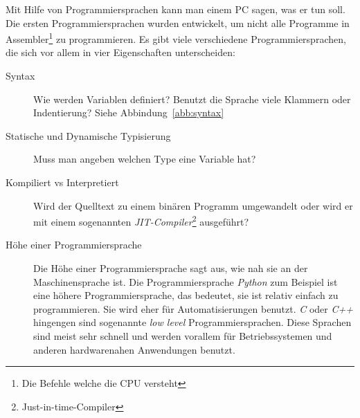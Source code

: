 \documentclass[a4paper, ngerman, 11pt]{scrartcl}
\begin{document}
Mit Hilfe von Programmiersprachen kann man einem PC sagen, was er tun soll.
Die ersten Programmiersprachen wurden entwickelt, um nicht alle Programme in Assembler\footnote{Die Befehle welche die CPU versteht} zu programmieren.
Es gibt viele verschiedene Programmiersprachen, die sich vor allem in vier Eigenschaften unterscheiden:

\begin{description}
	\item[Syntax]
		Wie werden Variablen definiert?
		Benutzt die Sprache viele Klammern oder Indentierung? Siehe Abbindung~\ref{abb:syntax}
	\item[Statische und Dynamische Typisierung]
		Muss man angeben welchen Type eine Variable hat?
	\item[Kompiliert vs Interpretiert]
		Wird der Quelltext zu einem binären Programm umgewandelt oder wird er mit einem sogenannten \textit{JIT-Compiler}\footnote{Just-in-time-Compiler} ausgeführt?
	\item[Höhe einer Programmiersprache]
		Die Höhe einer Programmiersprache sagt aus, wie nah sie an der Maschinensprache ist.
		Die Programmiersprache \emph{Python} zum Beispiel ist eine höhere Programmiersprache, das bedeutet, sie ist relativ einfach zu programmieren.
		Sie wird eher für Automatisierungen benutzt.
		\emph{C} oder \emph{C++} hingengen sind sogenannte \emph{low level} Programmiersprachen.
		Diese Sprachen sind meist sehr schnell und werden vorallem für Betriebssystemen und anderen hardwarenahen Anwendungen benutzt.
\end{description}
\end{document}
